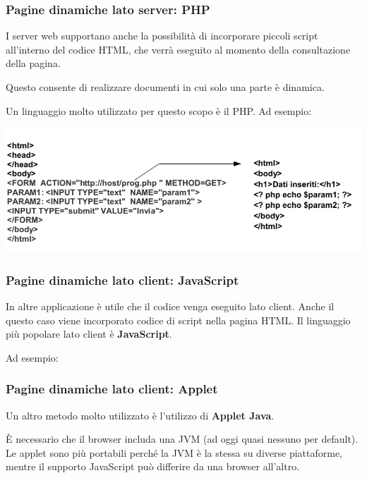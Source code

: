         \subsubsection{Pagine dinamiche lato server: PHP}
            I server web supportano anche la possibilità di incorporare piccoli script all'interno del codice HTML, che verrà eseguito al momento della consultazione della pagina.
        
            Questo consente di realizzare documenti in cui solo una parte è dinamica.
        
            Un linguaggio molto utilizzato per questo scopo è il PHP. Ad esempio:

            \begin{center}
                \includegraphics[scale=0.4]{chapters/6/assets/schema_v}
            \end{center}

        \subsubsection{Pagine dinamiche lato client: JavaScript}
            In altre applicazione è utile che il codice venga eseguito lato client. Anche il questo caso viene incorporato codice di script nella pagina HTML. Il linguaggio più popolare lato client è \textbf{JavaScript}.
        
            Ad esempio:
            

        \subsubsection{Pagine dinamiche lato client: Applet}
            Un altro metodo molto utilizzato è l'utilizzo di \textbf{Applet Java}.
        
            È necessario che il browser includa una JVM (ad oggi quasi nessuno per default). Le applet sono più portabili perché la JVM è la stessa su diverse piattaforme, mentre il supporto JavaScript può differire da una browser all'altro.
        
